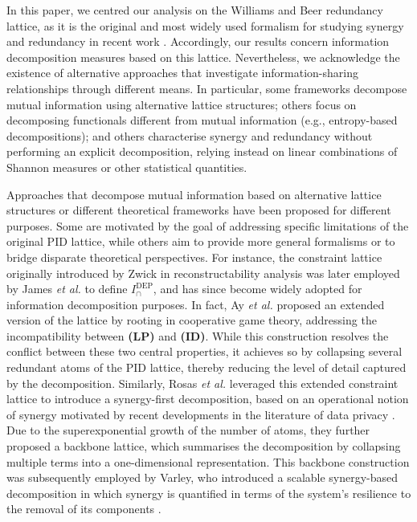 \documentclass{article}
\makeatletter
\newcommand{\etal}{\textit{et al.\@} }
\newcommand{\ID}{\textbf{(ID)}\xspace} %
\newcommand{\LP}{\textbf{(LP)}\xspace}
\newcommand{\IDEP}{\ensuremath{I_\cap^{\text{DEP}}}\xspace}
\makeatother
\begin{document}
In this paper, we centred our analysis on the Williams and Beer redundancy lattice, as it is the original and most widely used formalism for studying synergy and redundancy in recent work \cite{williams2010nonnegative}.
Accordingly, our results concern information decomposition measures based on this lattice.
Nevertheless, we acknowledge the existence of alternative approaches that investigate information-sharing relationships through different means.
In particular, some frameworks decompose mutual information using alternative lattice structures; others focus on decomposing functionals different from mutual information (e.g.\@, entropy-based decompositions); and others characterise synergy and redundancy without performing an explicit decomposition, relying instead on linear combinations of Shannon measures or other statistical quantities.

Approaches that decompose mutual information based on alternative lattice structures or different theoretical frameworks have been proposed for different purposes. 
Some are motivated by the goal of addressing specific limitations of the original PID lattice, while others aim to provide more general formalisms or to bridge disparate theoretical perspectives.
For instance, the constraint lattice originally introduced by Zwick in reconstructability analysis \cite{zwick2004overview} was later employed by James \etal to define \IDEP \cite{james2018unique}, and has since become widely adopted for information decomposition purposes.
In fact, Ay \etal proposed an extended version of the lattice by rooting in cooperative game theory, addressing the incompatibility between \LP and \ID \cite{ay2021information}. 
While this construction resolves the conflict between these two central properties, it achieves so by collapsing several redundant atoms of the PID lattice, thereby reducing the level of detail captured by the decomposition.
Similarly, Rosas \etal leveraged this extended constraint lattice to introduce a synergy-first decomposition, based on an operational notion of synergy motivated by recent developments in the literature of data privacy \cite{rosas2020operational}. 
Due to the superexponential growth of the number of atoms, they further proposed a backbone lattice, which summarises the decomposition by collapsing multiple terms into a one-dimensional representation.
This backbone construction was subsequently employed by Varley, who introduced a scalable synergy-based decomposition in which synergy is quantified in terms of the system’s resilience to the removal of its components \cite{varley2024scalable}.
\end{document}
